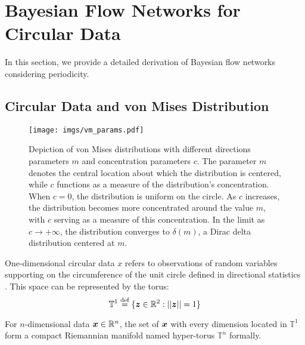 \appendix
\clearpage
\section{Bayesian Flow Networks for Circular Data}\label{appd:bfn_cir}
In this section, we provide a detailed derivation of Bayesian flow networks considering periodicity. 
\subsection{Circular Data and von Mises Distribution}\label{appd:vm_intro}
\begin{figure}
    \centering
    \texttt{[image: imgs/vm\_params.pdf]}
    \caption{Depiction of von Mises distributions with different directions parameters $m$ and concentration parameters $c$. The parameter $m$ denotes the central location about which the distribution is centered, while $c$ functions as a measure of the distribution's concentration. When $c = 0$, the distribution is uniform on the circle. As $c$ increases, the distribution becomes more concentrated around the value $m$, with $c$ serving as a measure of this concentration. In the limit as $c \rightarrow +\infty$, the distribution converges to $\delta(m)$, a Dirac delta distribution centered at $m$.  }
    \label{fig:vm_alpha}
\end{figure}
One-dimensional circular data $x$ refers to observations of random variables supporting on the circumference of the unit circle defined in directional statistics \citep{mardia2009directional,ley2017modern}. This space can be represented by the torus:
\begin{equation}
     \mathbb{T}^1\stackrel{\text{def}}{=} \{{\bm{z}}\in\mathbb{R}^2:||{\bm{z}}||=1\}
\end{equation}

For $n$-dimensional data ${\bm{x}}\in \mathbb{R}^n$, the set of ${\bm{x}}$ with every dimension located in $\mathbb{T}^1$ form a compact Riemannian manifold named hyper-torus $\mathbb{T}^n$ formally.

